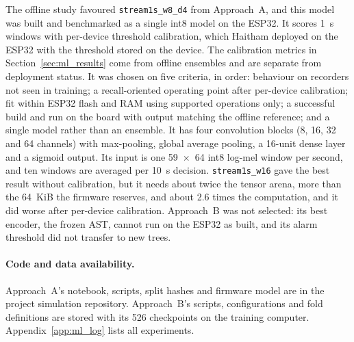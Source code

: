\subsubsection{}
\label{sec:ml_selection}
The offline study favoured \texttt{stream1s\_w8\_d4} from Approach~A, and this model was built and benchmarked as a single int8 model on the ESP32. It scores 1~s windows with per-device threshold calibration, which Haitham deployed on the ESP32 with the threshold stored on the device. The calibration metrics in Section~\ref{sec:ml_results} come from offline ensembles and are separate from deployment status. It was chosen on five criteria, in order: behaviour on recorders not seen in training; a recall-oriented operating point after per-device calibration; fit within ESP32 flash and RAM using supported operations only; a successful build and run on the board with output matching the offline reference; and a single model rather than an ensemble. It has four convolution blocks (8, 16, 32 and 64 channels) with max-pooling, global average pooling, a 16-unit dense layer and a sigmoid output. Its input is one 59~$\times$~64 int8 log-mel window per second, and ten windows are averaged per 10~s decision. \texttt{stream1s\_w16} gave the best result without calibration, but it needs about twice the tensor arena, more than the 64~KiB the firmware reserves, and about 2.6 times the computation, and it did worse after per-device calibration. Approach~B was not selected: its best encoder, the frozen AST, cannot run on the ESP32 as built, and its alarm threshold did not transfer to new trees.


\paragraph{Code and data availability.} Approach~A's notebook, scripts, split hashes and firmware model are in the project simulation repository. Approach~B's scripts, configurations and fold definitions are stored with its 526 checkpoints on the training computer. Appendix~\ref{app:ml_log} lists all experiments.
\endgroup
